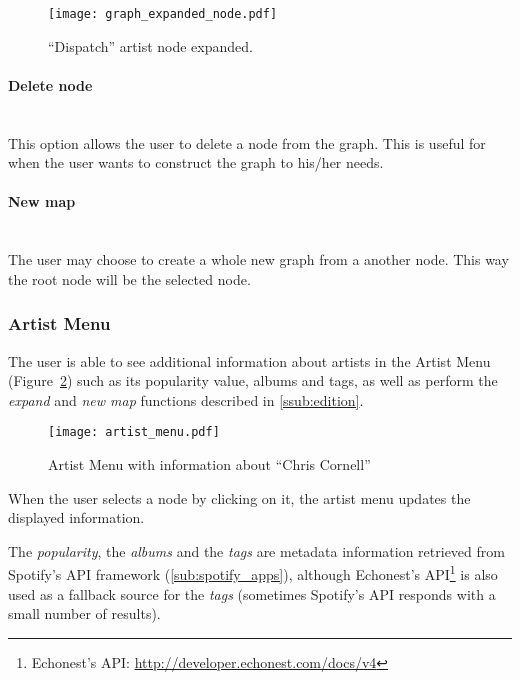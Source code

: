       \begin{figure}[b]
         \begin{center}
           \texttt{[image: graph\_expanded\_node.pdf]}
         \end{center}
         \caption{``Dispatch'' artist node expanded.}
         \label{fig:node_expanded}
      \end{figure}

      \paragraph{Delete node} \hfill \\
      This option allows the user to delete a node from the graph.
      This is useful for when the user wants to construct the graph to his/her needs.

      \paragraph{New map} \hfill \\
      The user may choose to create a whole new graph from a another node.
      This way the root node will be the selected node.



    \subsubsection{Artist Menu} %
      \label{ssub:artist_info}
      The user is able to see additional information about artists in the Artist Menu (Figure~\ref{fig:artist_menu}) such as its popularity value, albums and tags, as well as perform the \emph{expand} and \emph{new map} functions described in \ref{ssub:edition}.
      \begin{figure}[b]
        \begin{center}
          \texttt{[image: artist\_menu.pdf]}
        \end{center}
        \caption{Artist Menu with information about ``Chris Cornell''}
        \label{fig:artist_menu}
      \end{figure}
      When the user selects a node by clicking on it, the artist menu updates the displayed information.

      The \emph{popularity}, the \emph{albums} and the \emph{tags} are metadata information retrieved from Spotify's API framework (\ref{sub:spotify_apps}), although Echonest's API\footnote{Echonest's API: \url{http://developer.echonest.com/docs/v4}} is also used as a fallback source for the \emph{tags} (sometimes Spotify's API responds with a small number of results).

